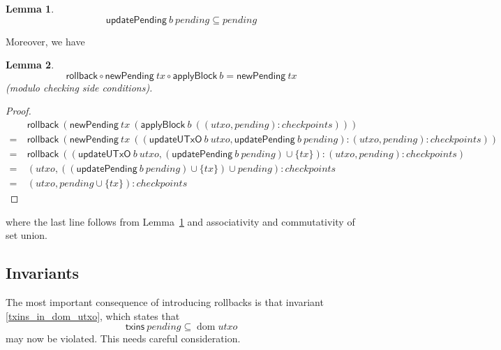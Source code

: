 \documentclass{article}
\DeclareMathOperator{\dom}{dom}
\newtheorem{lemma}{Lemma}
\begin{document}
\begin{lemma} \label{lemma:updatePending_is_filter}
\begin{equation*}
\mathsf{updatePending} ~ b ~ \mathit{pending} \subseteq \mathit{pending}
\end{equation*}
\end{lemma}

Moreover, we have

\begin{lemma}
\begin{equation*}
\mathsf{rollback} \circ \mathsf{newPending} ~ tx \circ \mathsf{applyBlock} ~ b
= \mathsf{newPending} ~ tx
\end{equation*}
(modulo checking side conditions).
\end{lemma}

\begin{proof}
\begin{align*}
    & \mathsf{rollback} ~ (\mathsf{newPending} ~ tx ~ (\mathsf{applyBlock} ~ b ~ ((\mathit{utxo}, \mathit{pending}) : \mathit{checkpoints}))) \\
= ~ & \mathsf{rollback} ~ (\mathsf{newPending} ~ tx ~ (( \mathsf{updateUTxO} ~ b ~ \mathit{utxo}
         , \mathsf{updatePending} ~ b ~ \mathit{pending}
         )
         : (\mathit{utxo}, \mathit{pending}) : \mathit{checkpoints}
         )) \\
= ~ & \mathsf{rollback} ~ (( \mathsf{updateUTxO} ~ b ~ \mathit{utxo}
         , (\mathsf{updatePending} ~ b ~ \mathit{pending}) \cup \{tx\}
         )
         : (\mathit{utxo}, \mathit{pending}) : \mathit{checkpoints}
         ) \\
= ~ & (\mathit{utxo}, ((\mathsf{updatePending} ~ b ~ \mathit{pending}) \cup \{tx\}) \cup \mathit{pending}) : \mathit{checkpoints} \\
= ~ & (\mathit{utxo}, \mathit{pending} \cup \{tx\}) : \mathit{checkpoints}
\end{align*}
\end{proof}

where the last line follows from Lemma~\ref{lemma:updatePending_is_filter} and
associativity and commutativity of set union.

\subsection{Invariants}

The most important consequence of introducing rollbacks is that invariant
\eqref{txins_in_dom_utxo}, which states that
%
\begin{equation*}
\mathsf{txins} ~ pending \subseteq \dom utxo
\end{equation*}
%
may now be violated. This needs careful consideration.
\end{document}
